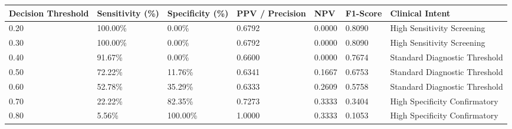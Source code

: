 \begin{tabular}{lllllll}
\toprule
Decision Threshold & Sensitivity (\%) & Specificity (\%) & PPV / Precision & NPV & F1-Score & Clinical Intent \\
\midrule
0.20 & 100.00\% & 0.00\% & 0.6792 & 0.0000 & 0.8090 & High Sensitivity Screening \\
0.30 & 100.00\% & 0.00\% & 0.6792 & 0.0000 & 0.8090 & High Sensitivity Screening \\
0.40 & 91.67\% & 0.00\% & 0.6600 & 0.0000 & 0.7674 & Standard Diagnostic Threshold \\
0.50 & 72.22\% & 11.76\% & 0.6341 & 0.1667 & 0.6753 & Standard Diagnostic Threshold \\
0.60 & 52.78\% & 35.29\% & 0.6333 & 0.2609 & 0.5758 & Standard Diagnostic Threshold \\
0.70 & 22.22\% & 82.35\% & 0.7273 & 0.3333 & 0.3404 & High Specificity Confirmatory \\
0.80 & 5.56\% & 100.00\% & 1.0000 & 0.3333 & 0.1053 & High Specificity Confirmatory \\
\bottomrule
\end{tabular}
